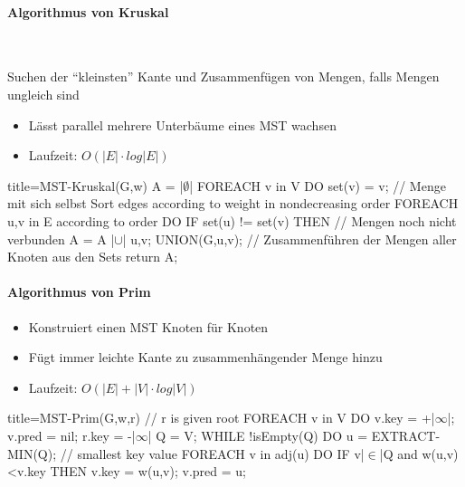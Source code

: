 \documentclass[
    ngerman,
    color=3b,
    dark_mode,
    load_common, %
    summary,
    boxarc,
]{tuda_summary}
\begin{document}
\paragraph{Algorithmus von Kruskal}\mbox{}\\
\begin{idea}\mbox{}
    Suchen der \enquote{kleinsten} Kante und Zusammenfügen von Mengen, falls Mengen ungleich sind
\end{idea}
\begin{itemize}
    \item Lässt parallel mehrere Unterbäume eines MST wachsen
    \item Laufzeit: $O(|E| \cdot log|E|)$
\end{itemize}
\begin{codeBlock}[autogobble,escapeinside=||,fontsize=\small]{title={MST-Kruskal(G,w)}}
A = |$\emptyset$|
FOREACH v in V DO
    set(v) = {v};       // Menge mit sich selbst
Sort edges according to weight in nondecreasing order
FOREACH {u,v} in E according to order DO
    IF set(u) != set(v) THEN    // Mengen noch nicht verbunden
        A = A |$\cup$| {{u,v}}; 
        UNION(G,u,v);   // Zusammenführen der Mengen aller Knoten aus den Sets
return A;
\end{codeBlock}
\clearpage
\paragraph{Algorithmus von Prim}
\begin{itemize}
    \item Konstruiert einen MST Knoten für Knoten
    \item Fügt immer leichte Kante zu zusammenhängender Menge hinzu
    \item Laufzeit: $O(|E| + |V| \cdot log|V|)$
\end{itemize}
\begin{codeBlock}[autogobble,escapeinside=||]{title={MST-Prim(G,w,r) // r is given root}}
    FOREACH v in V DO 
        v.key = +|$\infty$|;
        v.pred = nil;
    r.key = -|$\infty$|
    Q = V;
    WHILE !isEmpty(Q) DO
        u = EXTRACT-MIN(Q);     // smallest key value
        FOREACH v in adj(u) DO
            IF v|$\in$|Q and w({u,v})<v.key THEN
                v.key = w({u,v});
                v.pred = u;
\end{codeBlock}
\end{document}
